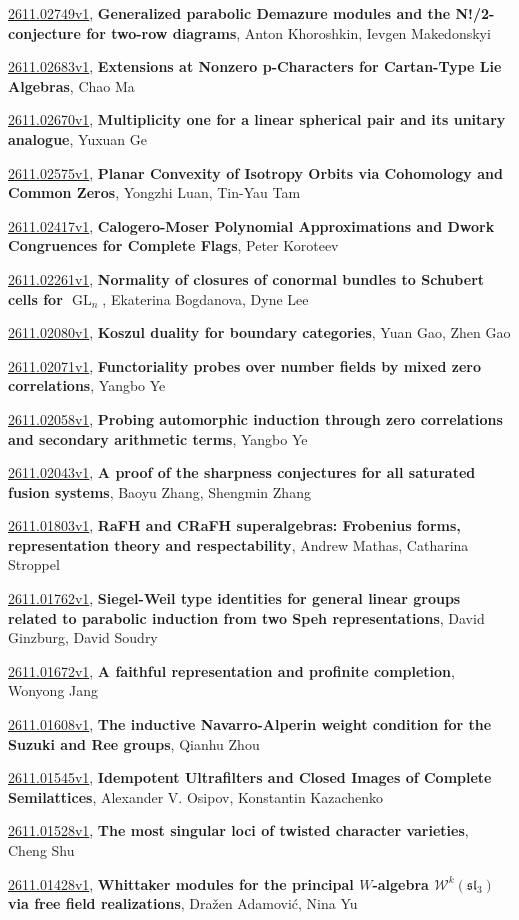 \documentclass[9pt, a4paper]{article}
\theoremstyle{plain}
\theoremstyle{definition}
\theoremstyle{remark}
\newcommand{\arxiv}[3]{\href{https://arxiv.org/abs/#1}{#1}, \textbf{\textcolor{arxivblue}{#2}}, #3}
\begin{document}
\arxiv{2611.02749v1}{Generalized parabolic Demazure modules and the N!/2-conjecture for two-row diagrams}{Anton Khoroshkin, Ievgen Makedonskyi}

\arxiv{2611.02683v1}{Extensions at Nonzero p-Characters for Cartan-Type Lie Algebras}{Chao Ma}

\arxiv{2611.02670v1}{Multiplicity one for a linear spherical pair and its unitary analogue}{Yuxuan Ge}

\arxiv{2611.02575v1}{Planar Convexity of Isotropy Orbits via Cohomology and Common Zeros}{Yongzhi Luan, Tin-Yau Tam}

\arxiv{2611.02417v1}{Calogero-Moser Polynomial Approximations and Dwork Congruences for Complete Flags}{Peter Koroteev}

\arxiv{2611.02261v1}{Normality of closures of conormal bundles to Schubert cells for $\operatorname{GL}_n$}{Ekaterina Bogdanova, Dyne Lee}

\arxiv{2611.02080v1}{Koszul duality for boundary categories}{Yuan Gao, Zhen Gao}

\arxiv{2611.02071v1}{Functoriality probes over number fields by mixed zero correlations}{Yangbo Ye}

\arxiv{2611.02058v1}{Probing automorphic induction through zero correlations and secondary arithmetic terms}{Yangbo Ye}

\arxiv{2611.02043v1}{A proof of the sharpness conjectures for all saturated fusion systems}{Baoyu Zhang, Shengmin Zhang}

\arxiv{2611.01803v1}{RaFH and CRaFH superalgebras: Frobenius forms, representation theory and respectability}{Andrew Mathas, Catharina Stroppel}

\arxiv{2611.01762v1}{Siegel-Weil type identities for general linear groups related to parabolic induction from two Speh representations}{David Ginzburg, David Soudry}

\arxiv{2611.01672v1}{A faithful representation and profinite completion}{Wonyong Jang}

\arxiv{2611.01608v1}{The inductive Navarro-Alperin weight condition for the Suzuki and Ree groups}{Qianhu Zhou}

\arxiv{2611.01545v1}{Idempotent Ultrafilters and Closed Images of Complete Semilattices}{Alexander V. Osipov, Konstantin Kazachenko}

\arxiv{2611.01528v1}{The most singular loci of twisted character varieties}{Cheng Shu}

\arxiv{2611.01428v1}{Whittaker modules for the principal $W$-algebra $\mathcal W^k(\mathfrak{sl}_3)$ via free field realizations}{Dražen Adamović, Nina Yu}
\end{document}
